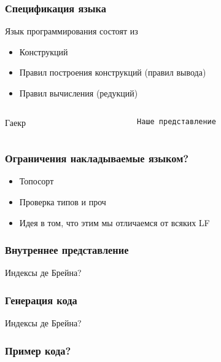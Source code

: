 \begin{frame}
\frametitle{Спецификация языка}
Язык программирования состоят из
\begin{itemize}
\item Конструкций
\item Правил построения конструкций (правил вывода)
\item Правил вычисления (редукций)
\end{itemize}
\end{frame}
\begin{frame}[fragile]
\begin{columns}[T] %
\begin{column}{.48\textwidth}

Гаекр

\end{column}%

\hfill%

\begin{column}{.48\textwidth}

\begin{verbatim}
Наше представление
\end{verbatim}

\end{column}%
\end{columns}

\end{frame}
\begin{frame}
\frametitle{Ограничения накладываемые языком?}
\begin{itemize}
\item Топосорт
\item Проверка типов и проч
\item Идея в том, что этим мы отличаемся от всяких LF
\end{itemize}
\end{frame}
\begin{frame}
\frametitle{Внутреннее представление}
Индексы де Брейна?
\end{frame}
\begin{frame}
\frametitle{Генерация кода}
Индексы де Брейна?
\end{frame}
\begin{frame}[fragile]
\frametitle{Пример кода?}

\end{frame}

